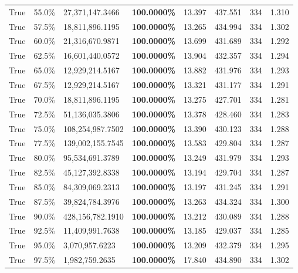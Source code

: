 \begin{table}[H]
\begin{tabular}{lllrllll}
\cline{1-8}
True & 55.0\% & 27,371,147.3466 & \bfseries \color{red} 100.0000\% & 13.397 & 437.551 & 334 & 1.310 \\
\cline{1-8}
True & 57.5\% & 18,811,896.1195 & \bfseries \color{red} 100.0000\% & 13.265 & 434.994 & 334 & 1.302 \\
\cline{1-8}
True & 60.0\% & 21,316,670.9871 & \bfseries \color{red} 100.0000\% & 13.699 & 431.689 & 334 & 1.292 \\
\cline{1-8}
True & 62.5\% & 16,601,440.0572 & \bfseries \color{red} 100.0000\% & 13.904 & 432.357 & 334 & 1.294 \\
\cline{1-8}
True & 65.0\% & 12,929,214.5167 & \bfseries \color{red} 100.0000\% & 13.882 & 431.976 & 334 & 1.293 \\
\cline{1-8}
True & 67.5\% & 12,929,214.5167 & \bfseries \color{red} 100.0000\% & 13.321 & 431.177 & 334 & 1.291 \\
\cline{1-8}
True & 70.0\% & 18,811,896.1195 & \bfseries \color{red} 100.0000\% & 13.275 & 427.701 & 334 & 1.281 \\
\cline{1-8}
True & 72.5\% & 51,136,035.3806 & \bfseries \color{red} 100.0000\% & 13.378 & 428.460 & 334 & 1.283 \\
\cline{1-8}
True & 75.0\% & 108,254,987.7502 & \bfseries \color{red} 100.0000\% & 13.390 & 430.123 & 334 & 1.288 \\
\cline{1-8}
True & 77.5\% & 139,002,155.7545 & \bfseries \color{red} 100.0000\% & 13.583 & 429.804 & 334 & 1.287 \\
\cline{1-8}
True & 80.0\% & 95,534,691.3789 & \bfseries \color{red} 100.0000\% & 13.249 & 431.979 & 334 & 1.293 \\
\cline{1-8}
True & 82.5\% & 45,127,392.8338 & \bfseries \color{red} 100.0000\% & 13.194 & 429.704 & 334 & 1.287 \\
\cline{1-8}
True & 85.0\% & 84,309,069.2313 & \bfseries \color{red} 100.0000\% & 13.197 & 431.245 & 334 & 1.291 \\
\cline{1-8}
True & 87.5\% & 39,824,784.3976 & \bfseries \color{red} 100.0000\% & 13.263 & 434.324 & 334 & 1.300 \\
\cline{1-8}
True & 90.0\% & 428,156,782.1910 & \bfseries \color{red} 100.0000\% & 13.212 & 430.089 & 334 & 1.288 \\
\cline{1-8}
True & 92.5\% & 11,409,991.7638 & \bfseries \color{red} 100.0000\% & 13.185 & 429.037 & 334 & 1.285 \\
\cline{1-8}
True & 95.0\% & 3,070,957.6223 & \bfseries \color{red} 100.0000\% & 13.209 & 432.379 & 334 & 1.295 \\
\cline{1-8}
True & 97.5\% & 1,982,759.2635 & \bfseries \color{red} 100.0000\% & 17.840 & 434.890 & 334 & 1.302 \\
\cline{1-8}
\bottomrule
\end{tabular}
\end{table}
